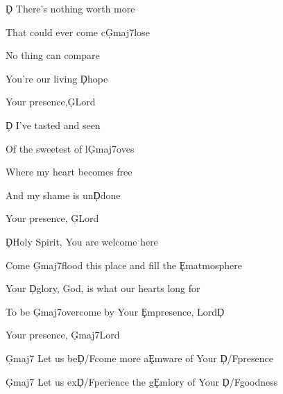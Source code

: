 \documentclass[9pt]{extarticle}
\begin{document}
\bsong

\bv
\c{D} There's nothing worth more

That could ever come c\c{Gmaj7}lose

No thing can compare

You're our living \c{D}hope

Your presence,\c{G}Lord
\ev

\bv
\c{D} I've tasted and seen

Of the sweetest of l\c{Gmaj7}oves

Where my heart becomes free

And my shame is un\c{D}done

Your presence, \c{G}Lord
\ev

\bc
\c{D}Holy Spirit, You are welcome here

Come \c{Gmaj7}flood this place and fill the \c{Em}atmosphere

Your \c{D}glory, God, is what our hearts long for

To be \c{Gmaj7}overcome by Your \c{Em}presence, Lord\c{D}

Your presence, \c{Gmaj7}Lord
\ec




\bb[4]
\c{Gmaj7} Let us be\c{D/F\s }come more a\c{Em}ware of Your \c{D/F\s }presence

\c{Gmaj7} Let us ex\c{D/F\s }perience the g\c{Em}lory of Your \c{D/F\s }goodness
\eb


\esong
\end{document}
